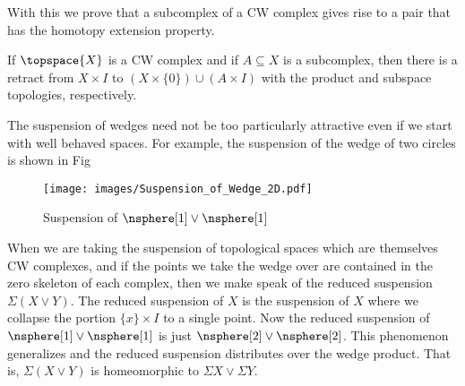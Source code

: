\documentclass{book}                                                           %
\begin{document}
                With this we prove that a subcomplex of a CW complex gives rise
                to a pair that has the homotopy extension property.
                \begin{theorem}
                    If $\topspace{X}$ is a CW complex and if $A\subseteq{X}$ is
                    a subcomplex, then there is a retract from
                    $X\times{I}$ to $(X\times\{0\})\cup(A\times{I})$ with the
                    product and subspace topologies, respectively.
                \end{theorem}
                The suspension of wedges need not be too particularly attractive
                even if we start with well behaved spaces. For example, the
                suspension of the wedge of two circles is shown in Fig
                \begin{figure}[H]
                    \centering
                    \captionsetup{type=figure}
                    \texttt{[image: images/Suspension\_of\_Wedge\_2D.pdf]}
                    \caption{Suspension of $\nsphere[1]\lor\nsphere[1]$}
                    \label{fig:Suspesnion_of_Wedge}
                \end{figure}
                When we are taking the suspension of topological spaces which
                are themselves CW complexes, and if the points we take the wedge
                over are contained in the zero skeleton of each complex, then we
                make speak of the reduced suspension $\Sigma(X\lor{Y})$. The
                reduced suspension of $X$ is the suspension of $X$ where we
                collapse the portion $\{x\}\times{I}$ to a single point. Now the
                reduced suspension of $\nsphere[1]\lor\nsphere[1]$ is just
                $\nsphere[2]\lor\nsphere[2]$. This phenomenon generalizes and
                the reduced suspension distributes over the wedge product. That
                is, $\Sigma(X\lor{Y})$ is homeomorphic to
                $\Sigma{X}\lor\Sigma{Y}$.
\end{document}
